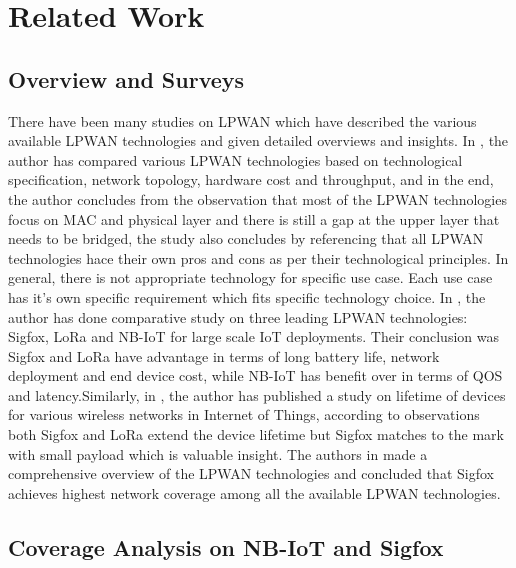 \documentclass[12pt]{article}
\begin{document}


\section{Related Work}\label{related work}

\subsection{Overview and Surveys}
There have been many studies on LPWAN which have described the various available LPWAN technologies and given detailed overviews and insights. In \cite{raza2017low}, the author has compared various LPWAN technologies based on technological specification, network topology, hardware cost and throughput, and in the end, the author concludes from the observation that most of the LPWAN technologies focus on MAC and physical layer and there is still a gap at the upper layer that needs to be bridged, the study also concludes by referencing that all LPWAN technologies hace their own pros and cons as per their technological principles. In general, there is not appropriate technology for specific use case. Each use case has it's own specific requirement which fits specific technology choice. In \cite{mekki2019comparative}, the author has done comparative study on three leading LPWAN technologies: Sigfox, LoRa and NB-IoT for large scale IoT deployments. Their conclusion was Sigfox and LoRa have advantage in terms of long battery life, network deployment and end device cost, while NB-IoT has benefit over in terms of QOS and latency.Similarly, in \cite{morin2017comparison}, the author has published a study on lifetime of devices for various wireless networks in Internet of Things, according to observations both Sigfox and LoRa extend the device lifetime but Sigfox matches to the mark with small payload which is valuable insight. The authors in \cite{mekki2018overview} made a comprehensive overview of the LPWAN technologies and concluded that Sigfox achieves highest network coverage among all the available LPWAN technologies.\par

\subsection{Coverage Analysis on NB-IoT and Sigfox}
\end{document}

